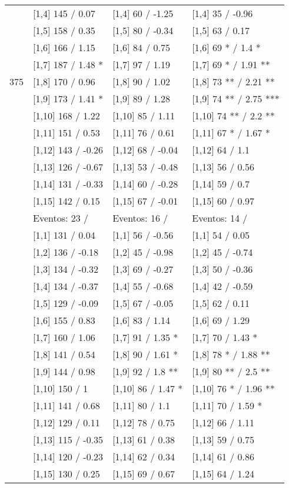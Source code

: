 \begin{table}
\begin{tabular}[t]{llll}
\addlinespace
 & {}[1,4] 145  / 0.07 & {}[1,4] 60  / -1.25 & {}[1,4] 35  / -0.96\\
 & {}[1,5] 158  / 0.35 & {}[1,5] 80  / -0.34 & {}[1,5] 63  / 0.17\\
 & {}[1,6] 166  / 1.15 & {}[1,6] 84  / 0.75 & {}[1,6] 69 * / 1.4 *\\
 & {}[1,7] 187  / 1.48 * & {}[1,7] 97  / 1.19 & {}[1,7] 69 * / 1.91 **\\
375 & {}[1,8] 170  / 0.96 & {}[1,8] 90  / 1.02 & {}[1,8] 73 ** / 2.21 **\\
\addlinespace
 & {}[1,9] 173  / 1.41 * & {}[1,9] 89  / 1.28 & {}[1,9] 74 ** / 2.75 ***\\
 & {}[1,10] 168  / 1.22 & {}[1,10] 85  / 1.11 & {}[1,10] 74 ** / 2.2 **\\
 & {}[1,11] 151  / 0.53 & {}[1,11] 76  / 0.61 & {}[1,11] 67 * / 1.67 *\\
 & {}[1,12] 143  / -0.26 & {}[1,12] 68  / -0.04 & {}[1,12] 64  / 1.1\\
 & {}[1,13] 126  / -0.67 & {}[1,13] 53  / -0.48 & {}[1,13] 56  / 0.56\\
\addlinespace
 & {}[1,14] 131  / -0.33 & {}[1,14] 60  / -0.28 & {}[1,14] 59  / 0.7\\
 & {}[1,15] 142  / 0.15 & {}[1,15] 67  / -0.01 & {}[1,15] 60  / 0.97\\
 & Eventos:  23 / & Eventos:  16 / & Eventos:  14 /\\
 & {}[1,1] 131  / 0.04 & {}[1,1] 56  / -0.56 & {}[1,1] 54  / 0.05\\
 & {}[1,2] 136  / -0.18 & {}[1,2] 45  / -0.98 & {}[1,2] 45  / -0.74\\
\addlinespace
 & {}[1,3] 134  / -0.32 & {}[1,3] 69  / -0.27 & {}[1,3] 50  / -0.36\\
 & {}[1,4] 134  / -0.37 & {}[1,4] 55  / -0.68 & {}[1,4] 42  / -0.59\\
 & {}[1,5] 129  / -0.09 & {}[1,5] 67  / -0.05 & {}[1,5] 62  / 0.11\\
 & {}[1,6] 155  / 0.83 & {}[1,6] 83  / 1.14 & {}[1,6] 69  / 1.29\\
 & {}[1,7] 160  / 1.06 & {}[1,7] 91  / 1.35 * & {}[1,7] 70  / 1.43 *\\
\addlinespace
500 & {}[1,8] 141  / 0.54 & {}[1,8] 90  / 1.61 * & {}[1,8] 78 * / 1.88 **\\
 & {}[1,9] 144  / 0.98 & {}[1,9] 92  / 1.8 ** & {}[1,9] 80 ** / 2.5 **\\
 & {}[1,10] 150  / 1 & {}[1,10] 86  / 1.47 * & {}[1,10] 76 * / 1.96 **\\
 & {}[1,11] 141  / 0.68 & {}[1,11] 80  / 1.1 & {}[1,11] 70  / 1.59 *\\
 & {}[1,12] 129  / 0.11 & {}[1,12] 78  / 0.75 & {}[1,12] 66  / 1.11\\
\addlinespace
 & {}[1,13] 115  / -0.35 & {}[1,13] 61  / 0.38 & {}[1,13] 59  / 0.75\\
 & {}[1,14] 120  / -0.23 & {}[1,14] 62  / 0.34 & {}[1,14] 61  / 0.86\\
 & {}[1,15] 130  / 0.25 & {}[1,15] 69  / 0.67 & {}[1,15] 64  / 1.24\\
\bottomrule
\end{tabular}
\end{table}
